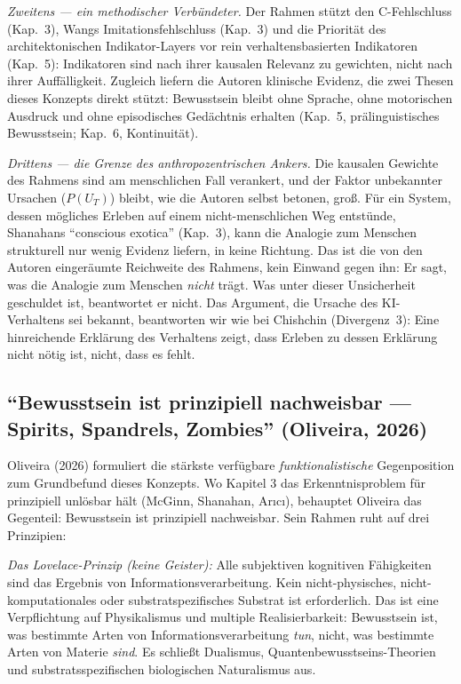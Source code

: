 \documentclass[acmlarge, noacm]{acmart}
\begin{document}
\textit{Zweitens --- ein methodischer Verbündeter.} Der Rahmen stützt den C-Fehlschluss (Kap.~3), Wangs Imitationsfehlschluss (Kap.~3) und die Priorität des architektonischen Indikator-Layers vor rein verhaltensbasierten Indikatoren (Kap.~5): Indikatoren sind nach ihrer kausalen Relevanz zu gewichten, nicht nach ihrer Auffälligkeit. Zugleich liefern die Autoren klinische Evidenz, die zwei Thesen dieses Konzepts direkt stützt: Bewusstsein bleibt ohne Sprache, ohne motorischen Ausdruck und ohne episodisches Gedächtnis erhalten (Kap.~5, prälinguistisches Bewusstsein; Kap.~6, Kontinuität).

\textit{Drittens --- die Grenze des anthropozentrischen Ankers.} Die kausalen Gewichte des Rahmens sind am menschlichen Fall verankert, und der Faktor unbekannter Ursachen ($P(U_T)$) bleibt, wie die Autoren selbst betonen, groß. Für ein System, dessen mögliches Erleben auf einem nicht-menschlichen Weg entstünde, Shanahans ``conscious exotica'' (Kap.~3), kann die Analogie zum Menschen strukturell nur wenig Evidenz liefern, in keine Richtung. Das ist die von den Autoren eingeräumte Reichweite des Rahmens, kein Einwand gegen ihn: Er sagt, was die Analogie zum Menschen \textit{nicht} trägt. Was unter dieser Unsicherheit geschuldet ist, beantwortet er nicht. Das Argument, die Ursache des KI-Verhaltens sei bekannt, beantworten wir wie bei Chishchin (Divergenz~3): Eine hinreichende Erklärung des Verhaltens zeigt, dass Erleben zu dessen Erklärung nicht nötig ist, nicht, dass es fehlt.

\subsection{``Bewusstsein ist prinzipiell nachweisbar --- Spirits, Spandrels, Zombies'' (Oliveira, 2026)}

Oliveira (2026) \cite{oliveira2026} formuliert die stärkste verfügbare \textit{funktionalistische} Gegenposition zum Grundbefund dieses Konzepts. Wo Kapitel 3 das Erkenntnisproblem für prinzipiell unlösbar hält (McGinn, Shanahan, Ar{\i}c{\i}), behauptet Oliveira das Gegenteil: Bewusstsein ist prinzipiell nachweisbar. Sein Rahmen ruht auf drei Prinzipien:

\textit{Das Lovelace-Prinzip (keine Geister):} Alle subjektiven kognitiven Fähigkeiten sind das Ergebnis von Informationsverarbeitung. Kein nicht-physisches, nicht-komputationales oder substratspezifisches Substrat ist erforderlich. Das ist eine Verpflichtung auf Physikalismus und multiple Realisierbarkeit: Bewusstsein ist, was bestimmte Arten von Informationsverarbeitung \textit{tun}, nicht, was bestimmte Arten von Materie \textit{sind}. Es schließt Dualismus, Quantenbewusstseins-Theorien und substratsspezifischen biologischen Naturalismus aus.
\end{document}
